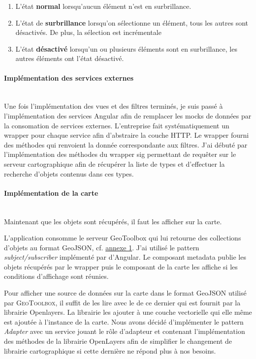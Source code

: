 \documentclass{rapportUHA40}
\begin{document}
\begin{enumerate}
  \item L'état \textbf{normal} lorsqu'aucun élément n'est en surbrillance.
  \item L'état de \textbf{surbrillance} lorsqu'on sélectionne un élément, tous les
        autres sont désactivés. De plus, la sélection est incrémentale
  \item L'état \textbf{désactivé} lorsqu'un ou plusieurs éléments sont en surbrillance,
        les autres éléments ont l'état désactivé.
\end{enumerate}

\paragraph{Implémentation des services externes}\mbox{}\\
Une fois l'implémentation des vues et des filtres terminés, je suis passé à
l'implémentation des services Angular afin de remplacer les mocks de données
par la consomation de services externes. L'entreprise fait systématiquement un
\gls{wrapper} pour chaque service afin d'abstraire la couche HTTP\@. Le wrapper
fourni des méthodes qui renvoient la donnée correspondante aux filtres. J'ai
débuté par l'implémentation des méthodes du \gls{wrapper} \gls{sig} permettant
de requêter sur le serveur cartographique afin de récupérer la liste de types
et d'effectuer la recherche d'objets contenus dans ces types. \\

\paragraph{Implémentation de la carte}\mbox{}\\
Maintenant que les objets sont récupérés, il faut les afficher sur la carte.


L'application consomme le serveur GeoToolbox qui lui retourne des collections
d'objets au format GeoJSON, cf. \hyperlink{ANNEX1}{annexe 1}. J'ai utilisé le
pattern \textit{subject/subscriber} implémenté par d'Angular. Le composant
metadata publie les objets récupérés par le wrapper puis le composant de la
carte les affiche si les conditions d'affichage sont réunies.

Pour afficher une source de données sur la carte dans le format GeoJSON utilisé
par \textsc{GeoToolbox}, il suffit de les lire avec le  \fg{} de ce
dernier qui est fournit par la librairie Openlayers. La librairie les ajouter à
une couche vectorielle qui elle même est ajoutée à l'instance de la carte. Nous
avons décidé d'implémenter le pattern \textit{Adapter} avec un service jouant
le rôle d'adapteur et contenant l'implémentation des méthodes de la librairie
OpenLayers afin de simplifier le changement de librairie cartographique si
cette dernière ne répond plus à nos besoins.
\end{document}

